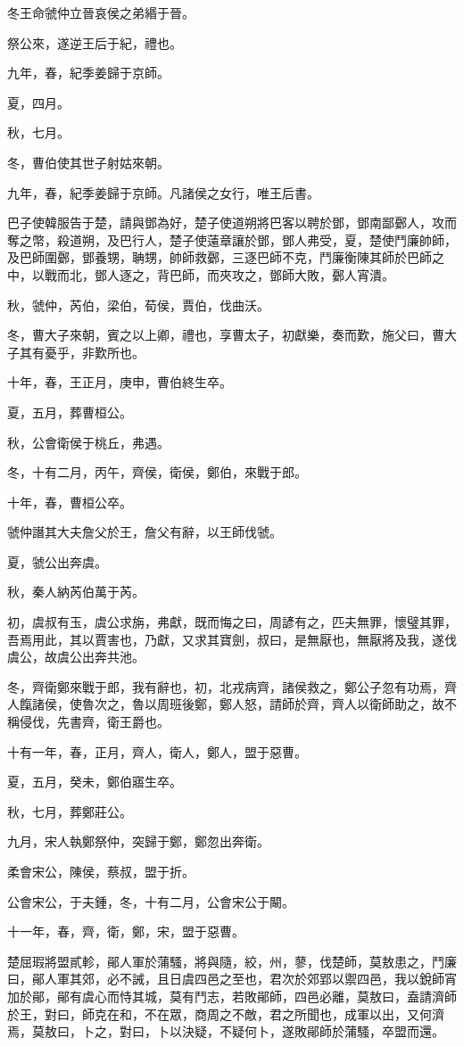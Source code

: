 \begin{pinyinscope}
冬王命虢仲立晉哀侯之弟緡于晉。

祭公來，遂逆王后于紀，禮也。

九年，春，紀季姜歸于京師。

夏，四月。

秋，七月。

冬，曹伯使其世子射姑來朝。

九年，春，紀季姜歸于京師。凡諸侯之女行，唯王后書。

巴子使韓服告于楚，請與鄧為好，楚子使道朔將巴客以聘於鄧，鄧南鄙鄾人，攻而奪之幣，殺道朔，及巴行人，楚子使薳章讓於鄧，鄧人弗受，夏，楚使鬥廉帥師，及巴師圍鄾，鄧養甥，聃甥，帥師救鄾，三逐巴師不克，鬥廉衡陳其師於巴師之中，以戰而北，鄧人逐之，背巴師，而夾攻之，鄧師大敗，鄾人宵潰。

秋，虢仲，芮伯，梁伯，荀侯，賈伯，伐曲沃。

冬，曹大子來朝，賓之以上卿，禮也，享曹太子，初獻樂，奏而歎，施父曰，曹大子其有憂乎，非歎所也。

十年，春，王正月，庚申，曹伯終生卒。

夏，五月，葬曹桓公。

秋，公會衛侯于桃丘，弗遇。

冬，十有二月，丙午，齊侯，衛侯，鄭伯，來戰于郎。

十年，春，曹桓公卒。

虢仲譖其大夫詹父於王，詹父有辭，以王師伐虢。

夏，虢公出奔虞。

秋，秦人納芮伯萬于芮。

初，虞叔有玉，虞公求旃，弗獻，既而悔之曰，周諺有之，匹夫無罪，懷璧其罪，吾焉用此，其以賈害也，乃獻，又求其寶劍，叔曰，是無厭也，無厭將及我，遂伐虞公，故虞公出奔共池。

冬，齊衛鄭來戰于郎，我有辭也，初，北戎病齊，諸侯救之，鄭公子忽有功焉，齊人餼諸侯，使魯次之，魯以周班後鄭，鄭人怒，請師於齊，齊人以衛師助之，故不稱侵伐，先書齊，衛王爵也。

十有一年，春，正月，齊人，衛人，鄭人，盟于惡曹。

夏，五月，癸未，鄭伯寤生卒。

秋，七月，葬鄭莊公。

九月，宋人執鄭祭仲，突歸于鄭，鄭忽出奔衛。

柔會宋公，陳侯，蔡叔，盟于折。

公會宋公，于夫鍾，冬，十有二月，公會宋公于闞。

十一年，春，齊，衛，鄭，宋，盟于惡曹。

楚屈瑕將盟貳軫，鄖人軍於蒲騷，將與隨，絞，州，蓼，伐楚師，莫敖患之，鬥廉曰，鄖人軍其郊，必不誡，且日虞四邑之至也，君次於郊郢以禦四邑，我以銳師宵加於鄖，鄖有虞心而恃其城，莫有鬥志，若敗鄖師，四邑必離，莫敖曰，盍請濟師於王，對曰，師克在和，不在眾，商周之不敵，君之所聞也，成軍以出，又何濟焉，莫敖曰，卜之，對曰，卜以決疑，不疑何卜，遂敗鄖師於蒲騷，卒盟而還。


\end{pinyinscope}
